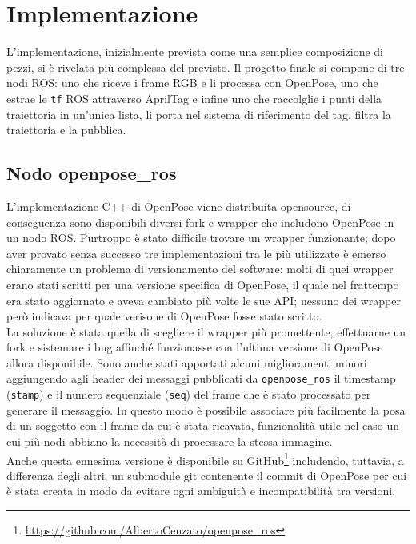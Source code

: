 \documentclass[10pt,twocolumn]{article}
\begin{document}
\section{Implementazione}
L'implementazione, inizialmente prevista come una semplice composizione di
pezzi, si è rivelata più complessa del previsto. Il progetto finale si compone
di tre nodi ROS: uno che riceve i frame RGB e li processa con OpenPose, uno che
estrae le \verb|tf| ROS attraverso AprilTag e infine uno che raccolglie i punti della
traiettoria in un'unica lista, li porta nel sistema di riferimento del tag,
filtra la traiettoria e la pubblica.

  \subsection{Nodo openpose\_ros}
  \label{sec:openpose_ros}
  L'implementazione C++ di OpenPose viene distribuita opensource, di conseguenza
  sono disponibili diversi fork e wrapper che includono OpenPose in un nodo ROS.
  Purtroppo è stato difficile trovare un wrapper funzionante; dopo aver provato
  senza successo tre implementazioni tra le più utilizzate è emerso chiaramente
  un problema di versionamento del software: molti di quei wrapper erano stati
  scritti per una versione specifica di OpenPose, il quale nel frattempo era
  stato aggiornato e aveva cambiato più volte le sue API; nessuno dei wrapper
  però indicava per quale verisone di OpenPose fosse stato scritto. \\
  La soluzione è stata quella di scegliere il wrapper più promettente,
  effettuarne un fork e sistemare i bug affinché funzionasse con l'ultima
  versione di OpenPose allora disponibile. Sono anche stati apportati alcuni
  miglioramenti minori aggiungendo agli header dei messaggi pubblicati da
  \verb|openpose_ros| il timestamp (\verb|stamp|) e il numero sequenziale
  (\verb|seq|) del frame che è stato processato per generare il messaggio. In
  questo modo è possibile associare più facilmente la posa di un soggetto con il
  frame da cui è stata ricavata, funzionalità utile nel caso un cui più nodi
  abbiano la necessità di processare la stessa immagine. \\
  Anche questa ennesima versione è disponibile su
  GitHub\footnote{\url{https://github.com/AlbertoCenzato/openpose_ros}}
  includendo, tuttavia, a differenza degli altri, un submodule git contenente il
  commit di OpenPose per cui è stata creata in modo da evitare ogni ambiguità e
  incompatibilità tra versioni. 
\end{document}
